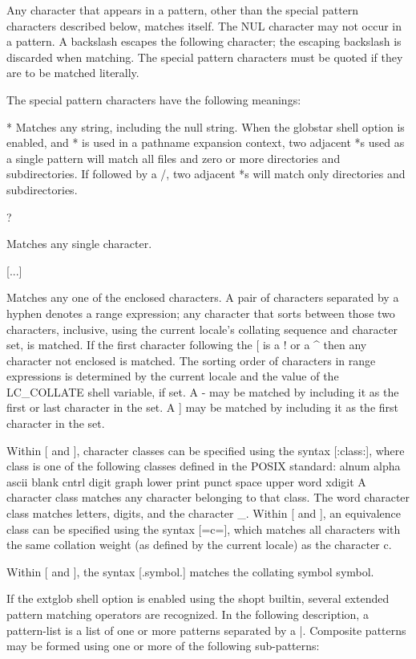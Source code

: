 Any character that appears in a pattern, other than the special pattern characters described below, matches itself. The NUL character may not occur in a pattern. A backslash escapes the following character; the escaping backslash is discarded when matching. The special pattern characters must be quoted if they are to be matched literally.

The special pattern characters have the following meanings:

*
Matches any string, including the null string. When the globstar shell option is enabled, and * is used in a pathname expansion context, two adjacent *s used as a single pattern will match all files and zero or more directories and subdirectories. If followed by a /, two adjacent *s will match only directories and subdirectories.

?

Matches any single character.

[...]

Matches any one of the enclosed characters. A pair of characters separated by a hyphen denotes a range expression; any character that sorts between those two characters, inclusive, using the current locale's collating sequence and character set, is matched. If the first character following the [ is a ! or a \^{} then any character not enclosed is matched. The sorting order of characters in range expressions is determined by the current locale and the value of the LC\_COLLATE shell variable, if set. A - may be matched by including it as the first or last character in the set. A ] may be matched by including it as the first character in the set.

Within [ and ], character classes can be specified using the syntax [:class:], where class is one of the following classes defined in the POSIX standard:
alnum alpha ascii blank cntrl digit graph lower print punct space upper word xdigit
A character class matches any character belonging to that class. The word character class matches letters, digits, and the character \_.
Within [ and ], an equivalence class can be specified using the syntax [=c=], which matches all characters with the same collation weight (as defined by the current locale) as the character c.

Within [ and ], the syntax [.symbol.] matches the collating symbol symbol.

If the extglob shell option is enabled using the shopt builtin, several extended pattern matching operators are recognized. In the following description, a pattern-list is a list of one or more patterns separated by a |. Composite patterns may be formed using one or more of the following sub-patterns:

